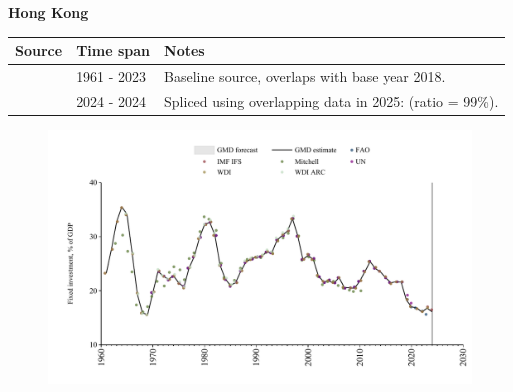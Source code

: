 \documentclass[12pt,a4paper,landscape]{article}
\begin{document}
\begin{adjustbox}{max totalsize={\paperwidth}{\paperheight},center}
\begin{minipage}[t][\textheight][t]{\textwidth}
\vspace*{0.5cm}
{}
\begin{center}
{\Large\bfseries Hong Kong}
\end{center}
\vspace{0.5cm}
\begin{table}[H]
\centering
\small
\begin{tabular}{|l|l|l|}
\hline
\textbf{Source} & \textbf{Time span} & \textbf{Notes} \\
\hline
\rowcolor{white}\cite{WDI}& 1961 - 2023 &Baseline source, overlaps with base year 2018.\\
\rowcolor{lightgray}\cite{IMF_IFS}& 2024 - 2024 &Spliced using overlapping data in 2025: (ratio = 99\%).\\
\hline
\end{tabular}
\end{table}
\begin{figure}[H]
\centering
\includegraphics[width=\textwidth,height=0.6\textheight,keepaspectratio]{graphs/HKG_finv_GDP.pdf}
\end{figure}
\end{minipage}
\end{adjustbox}
\end{document}
